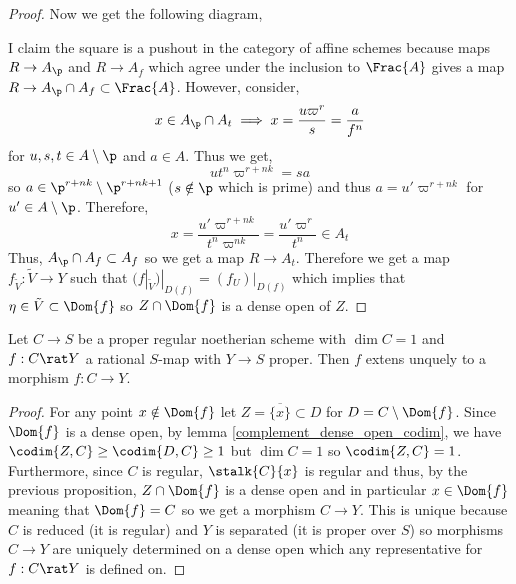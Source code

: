\documentclass[12pt]{article}
\begin{document}
\begin{proof}
Now we get the following diagram, 
\begin{center}
\end{center}
I claim the square is a pushout in the category of affine schemes because maps $R \to A_\p$ and $R \to A_f$ which agree under the inclusion to $\Frac{A}$ gives a map $R \to A_\p \cap A_f \subset \Frac{A}$. However, consider,
\[ x \in A_\p \cap A_t \implies x = \frac{u \varpi^r}{s} = \frac{a}{f^n} \]
for $u, s, t \in A \setminus \p$ and $a \in A$. Thus we get,
\[ u t^n \varpi^{r + nk} = s a \]
so $a \in \p^{r + nk} \setminus \p^{r + nk + 1}$ ($s \notin \p$ which is prime) and thus $a = u' \varpi^{r + nk}$ for $u' \in A \setminus \p$. Therefore,
\[ x = \frac{u' \varpi^{r + nk}}{t^n \varpi^{nk}} = \frac{u' \varpi^{r}}{t^n} \in A_t \]
Thus, $A_\p \cap A_f \subset A_f$ so we get a map $R \to A_t$. Therefore we get a map $f_{\tilde{V}} : \tilde{V} \to Y$ such that $(f|_{\tilde{V}})|_{D(f)} = (f_U)|_{D(f)}$ which implies that $\eta \in \tilde{V} \subset \Dom{f}$ so $Z \cap \Dom{f}$ is a dense open of $Z$. 
\end{proof}

\begin{prop}
Let $C \to S$ be a proper regular noetherian scheme with $\dim{C} = 1$ and $f : C \rat Y$ a rational $S$-map with $Y \to S$ proper. Then $f$ extens unquely to a morphism $f : C \to Y$. 
\end{prop}

\begin{proof}
For any point $x \notin \Dom{f}$ let $Z = \overline{\{ x \}} \subset D$ for $D = C \setminus \Dom{f}$. Since $\Dom{f}$ is a dense open, by lemma \ref{complement_dense_open_codim}, we have $\codim{Z, C} \ge \codim{D, C} \ge 1$ but $\dim{C} = 1$ so $\codim{Z, C} = 1$. Furthermore, since $C$ is regular, $\stalk{C}{x}$ is regular and thus, by the previous proposition, $Z \cap \Dom{f}$ is a dense open and in particular $x \in \Dom{f}$ meaning that $\Dom{f} = C$ so we get a morphism $C \to Y$. This is unique because $C$ is reduced (it is regular) and $Y$ is separated (it is proper over $S$) so morphisms $C \to Y$ are uniquely determined on a dense open which any representative for $f : C \rat Y$ is defined on.   
\end{proof}
\end{document}
